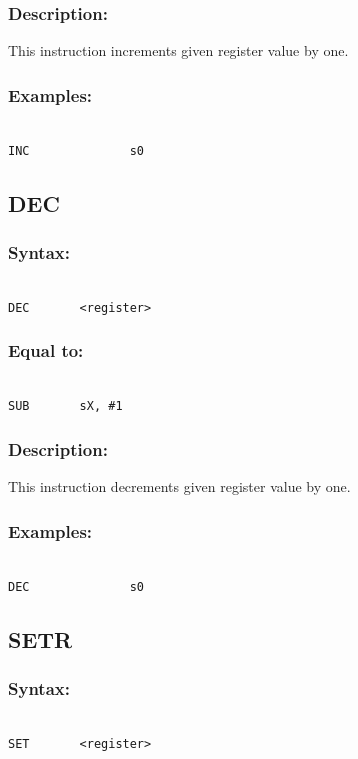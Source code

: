         \subsubsection{Description:}
    This instruction increments given register value by one.
        \subsubsection{Examples:}
        {
            ~\\
            \usecodefont
            \verb'INC              s0'\\
        }

    \subsection{DEC}
        \subsubsection{Syntax:}
        {
            ~\\
            \usecodefont
            \verb'DEC       <register>'
        }
        \subsubsection{Equal to:}
        {
            ~\\
            \usecodefont
            \verb'SUB       sX, #1'
        }
        \subsubsection{Description:}
    This instruction decrements given register value by one.
        \subsubsection{Examples:}
        {
            ~\\
            \usecodefont
            \verb'DEC              s0'\\
        }

    \subsection{SETR}
        \subsubsection{Syntax:}
        {
            ~\\
            \usecodefont
            \verb'SET       <register>'
        }
